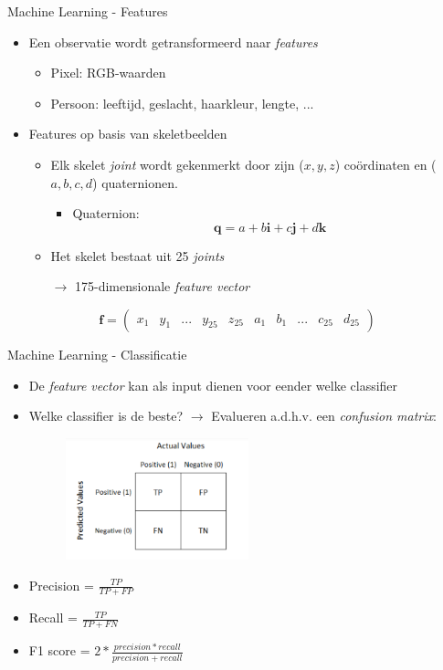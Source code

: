 \documentclass[]{beamer}
\begin{document}
	
	\begin{frame}{Machine Learning - Features}
		\begin{itemize}
			\item Een observatie wordt getransformeerd naar \textit{features}
			\begin{itemize}
				\item Pixel: RGB-waarden
				\item Persoon: leeftijd, geslacht, haarkleur, lengte, ...
			\end{itemize}
			\item Features op basis van skeletbeelden
			\begin{itemize}
				\item Elk skelet \textit{joint} wordt gekenmerkt door zijn ($x, y, z$) coördinaten en ($a, b, c, d$) quaternionen.
				\begin{itemize}
					\item Quaternion:
					$$\textbf{q} = a + b\textbf{i} + c\textbf{j} + d\textbf{k}$$
				\end{itemize}
				\item Het skelet bestaat uit 25 \textit{joints}
				\item[$\rightarrow$] 175-dimensionale \textit{feature vector}
				

			\end{itemize}
		
		\end{itemize}
		$$\textbf{f} = \begin{pmatrix}
		x_1 & y_1 &  ...&  y_{25} & z_{25} & a_1 & b_1 & ... & c_{25} & d_{25}
		\end{pmatrix}$$
	\end{frame}

	\begin{frame}{Machine Learning - Classificatie}
		\begin{itemize}
			\item De \textit{feature vector} kan als input dienen voor eender welke classifier
			\item Welke classifier is de beste? $\rightarrow$ Evalueren a.d.h.v. een \textit{confusion matrix}:
				\begin{figure}[ht]
					\centering
					\includegraphics[width=0.5\textwidth]{confusionmatrix}
				\end{figure}
				
				\item Precision = $\frac{TP}{TP + FP}$
				\item Recall = $\frac{TP}{TP + FN}$
				\item F1 score = $2*\frac{precision * recall}{precision + recall}$
				
		
		\end{itemize}
	\end{frame}
\end{document}
